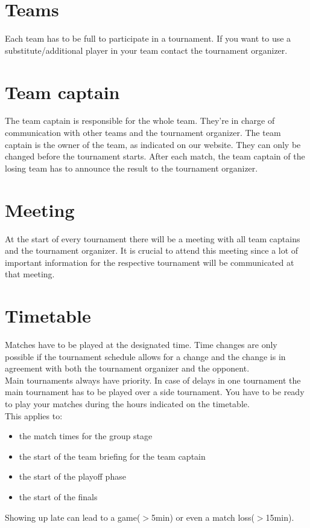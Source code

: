 \documentclass{article}
\begin{document}
\section{Teams}
Each team has to be full to participate in a tournament. If you want to use a substitute/additional player in your team contact the tournament organizer.

\section{Team captain}
The team captain is responsible for the whole team. They're in charge of
communication with other teams and the tournament organizer.
The team captain is the owner of the team, as indicated on our website.
They can only be changed before the tournament starts. After each match, the team captain of the losing team has to announce the result to the tournament organizer.


\section{Meeting}
At the start of every tournament there will be a meeting with all team captains and the tournament organizer. It is crucial to attend this meeting since a lot of important information for the respective tournament will be communicated at that meeting.


\section{Timetable}
Matches have to be played at the designated time. Time changes are only possible if the tournament schedule allows for a change and the change is in agreement with both the tournament organizer and the opponent.\\
Main tournaments always have priority. In case of delays in one tournament the main tournament has to be played over a side tournament.
You have to be ready to play your matches during the hours indicated on the timetable.\\
This applies to:
\begin{itemize}
	\item the match times for the group stage
	\item the start of the team briefing for the team captain
	\item the start of the playoff phase
	\item the start of the finals
\end{itemize}
Showing up late can lead to a game($>$5min) or even a match loss($>$15min).
\end{document}
